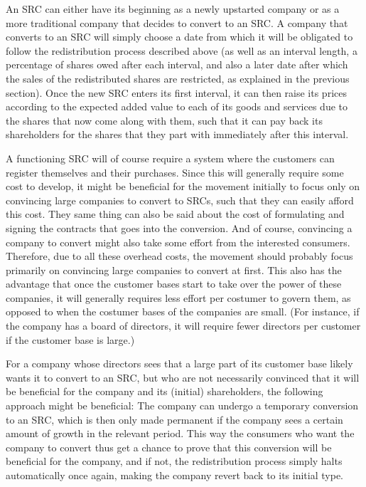 \documentclass{article}
\begin{document}
An SRC can either have its beginning as a newly upstarted company or as a more traditional company that decides to convert to an SRC. A company that converts to an SRC will simply choose a date from which it will be obligated to follow the redistribution process described above (as well as an interval length, a percentage of shares owed after each interval, and also a later date after which the sales of the redistributed shares are restricted, as explained in the previous section). Once the new SRC enters its first interval, it can then raise its prices according to the expected added value to each of its goods and services due to the shares that now come along with them, such that it can pay back its shareholders for the shares that they part with immediately after this interval.

A functioning SRC will of course require a system where the customers can register themselves and their purchases. Since this will generally require some cost to develop, it might be beneficial for the movement initially to focus only on convincing large companies to convert to SRCs, such that they can easily afford this cost. They same thing can also be said about the cost of formulating and signing the contracts that goes into the conversion. And of course, convincing a company to convert might also take some effort from the interested consumers. Therefore, due to all these overhead costs, the movement should probably focus primarily on convincing large companies to convert at first. This also has the advantage that once the customer bases start to take over the power of these companies, it will generally requires less effort per costumer to govern them, as opposed to when the costumer bases of the companies are small. (For instance, if the company has a board of directors, it will require fewer directors per customer if the customer base is large.)



For a company whose directors sees that a large part of its customer base likely wants it to convert to an SRC, but who are not necessarily convinced that it will be beneficial for the company and its (initial) shareholders, the following approach might be beneficial: The company can undergo a temporary conversion to an SRC, which is then only made permanent if the company sees a certain amount of growth in the relevant period. This way the consumers who want the company to convert thus get a chance to prove that this conversion will be beneficial for the company, and if not, the redistribution process simply halts automatically once again, making the company revert back to its initial type. 
\end{document}
